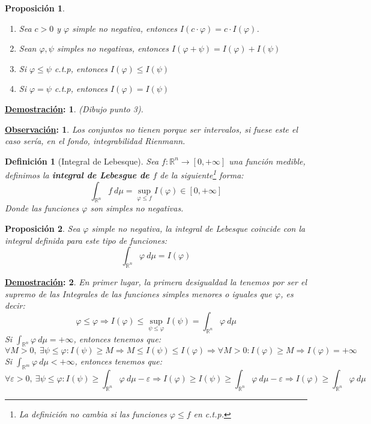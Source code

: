\documentclass[10pt,a4paper,openright]{book}
\theoremstyle{break}
\newtheorem*{defi}{Definición}
\newtheorem*{prop}{Proposición}
\newtheorem*{demo}{\underline{Demostración}:}
\newtheorem*{obs}{\underline{Observación}:}
\begin{document}
\begin{prop}
\begin{enumerate}
    \item Sea $c > 0$ y $\varphi$ simple no negativa, entonces $I\left(c\cdot \varphi\right) = c\cdot I\left(\varphi\right)$.
    \item Sean $\varphi, \psi$ simples no negativas, entonces $I\left(\varphi + \psi\right) = I\left(\varphi\right) + I\left(\psi\right)$
    \item Si $\varphi \le \psi$ c.t.p, entonces $I\left(\varphi\right) \le I\left(\psi\right)$
    \item Si $\varphi = \psi$ c.t.p, entonces $I\left(\varphi\right) = I\left(\psi\right)$
\end{enumerate}
\end{prop}
\begin{demo}
(\textit{Dibujo punto 3}). 
\end{demo}

\begin{obs}
Los conjuntos no tienen porque ser intervalos, si fuese este el caso sería, en el fondo, integrabilidad Rienmann.
\end{obs}

\begin{defi}[Integral de Lebesque]
Sea $f: \mathbb{R}^n \rightarrow \left[0, +\infty\right]$ una función medible, definimos la \textbf{integral de Lebesgue de $f$} de la siguiente\footnote{La definición no cambia si las funciones $\varphi \leq f$ en c.t.p.} forma:
$$\int_{\mathbb{R}^n}f \ d\mu = \sup_{\varphi \leq f} I\left(\varphi\right) \in \left[0, +\infty\right]$$
Donde las funciones $\varphi$ son simples no negativas.
\end{defi}

\begin{prop}
Sea $\varphi$ simple no negativa, la integral de Lebesque coincide con la integral definida para este tipo de funciones:
$$\int_{\mathbb{R}^n}\varphi \ d \mu = I\left(\varphi\right)$$
\end{prop}
\begin{demo}
En primer lugar, la primera desigualdad la tenemos por ser el supremo de las Integrales de las funciones simples menores o iguales que $\varphi$, es decir:
$$\varphi \le \varphi \Rightarrow I\left(\varphi\right) \leq \sup_{\psi \leq \varphi} I(\psi) = \int_{\mathbb{R}^n} \varphi \ d \mu $$
Si $\int_{\mathbb{R}^n} \varphi \ d \mu = +\infty$, entonces tenemos que:
$$\forall M > 0,\ \exists \psi \le \varphi: I\left(\psi\right) \ge M \Rightarrow M \le I\left(\psi\right) \le I\left(\varphi\right) \Rightarrow \forall M > 0: I\left(\varphi\right) \ge M \Rightarrow I\left(\varphi\right) = +\infty$$
Si $\int_{\mathbb{R}^m}\varphi \ d \mu < +\infty$, entonces tenemos que:
$$\forall \varepsilon > 0,\ \exists \psi \le \varphi: I\left(\psi\right) \ge \int_{\mathbb{R}^n}\varphi \ d \mu - \varepsilon \Rightarrow I\left(\varphi\right) \ge I(\psi) \geq  \int_{\mathbb{R}^n}\varphi \ d \mu - \varepsilon \Rightarrow I\left(\varphi\right) \ge \int_{\mathbb{R}^n}\varphi \ d \mu$$
\end{demo}
\end{document}
